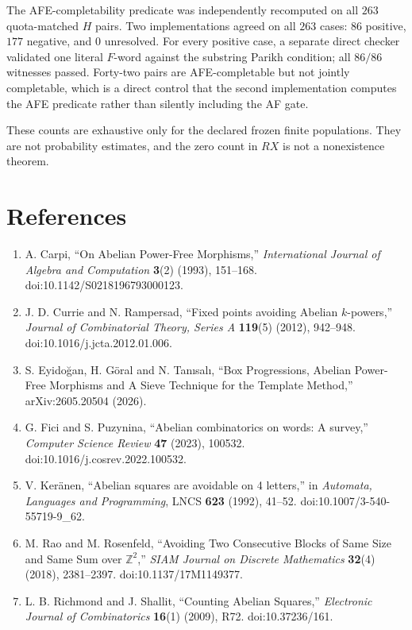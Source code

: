 \documentclass[
  british,
  a4paper,
  11pt]{article}
\newcounter{none} %
\begin{document}
The AFE-completability predicate was independently recomputed on all
\(263\) quota-matched \(H\) pairs. Two implementations agreed on all
\(263\) cases: \(86\) positive, \(177\) negative, and \(0\) unresolved.
For every positive case, a separate direct checker validated one literal
\(F\)-word against the substring Parikh condition; all \(86/86\)
witnesses passed. Forty-two pairs are AFE-completable but not jointly
completable, which is a direct control that the second implementation
computes the AFE predicate rather than silently including the AF gate.

These counts are exhaustive only for the declared frozen finite
populations. They are not probability estimates, and the zero count in
\(RX\) is not a nonexistence theorem.

\section*{References}\label{references}

\begin{enumerate}
\def\labelenumi{\arabic{enumi}.}
\item
  A. Carpi, ``On Abelian Power-Free Morphisms,'' \emph{International
  Journal of Algebra and Computation} \textbf{3}(2) (1993), 151--168.
  doi:10.1142/S0218196793000123.
\item
  J. D. Currie and N. Rampersad, ``Fixed points avoiding Abelian
  \(k\)-powers,'' \emph{Journal of Combinatorial Theory, Series A}
  \textbf{119}(5) (2012), 942--948. doi:10.1016/j.jcta.2012.01.006.
\item
  S. Eyidoğan, H. Göral and N. Tanısalı, ``Box Progressions, Abelian
  Power-Free Morphisms and A Sieve Technique for the Template Method,''
  arXiv:2605.20504 (2026).
\item
  G. Fici and S. Puzynina, ``Abelian combinatorics on words: A survey,''
  \emph{Computer Science Review} \textbf{47} (2023), 100532.
  doi:10.1016/j.cosrev.2022.100532.
\item
  V. Keränen, ``Abelian squares are avoidable on 4 letters,'' in
  \emph{Automata, Languages and Programming}, LNCS \textbf{623} (1992),
  41--52. doi:10.1007/3-540-55719-9\_62.
\item
  M. Rao and M. Rosenfeld, ``Avoiding Two Consecutive Blocks of Same
  Size and Same Sum over \(\mathbb Z^2\),'' \emph{SIAM Journal on
  Discrete Mathematics} \textbf{32}(4) (2018), 2381--2397.
  doi:10.1137/17M1149377.
\item
  L. B. Richmond and J. Shallit, ``Counting Abelian Squares,''
  \emph{Electronic Journal of Combinatorics} \textbf{16}(1) (2009), R72.
  doi:10.37236/161.
\end{enumerate}
\end{document}
